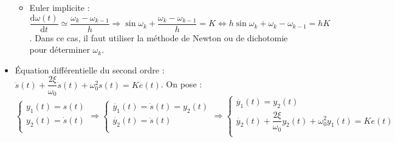 \documentclass[10pt,fleqn]{article} %
\begin{document}
\begin{itemize}[label=,font=\color{ocre}]
\begin{itemize}
\item Euler implicite : $\dfrac{\text{d} \omega(t)}{\text{d}t}\simeq \dfrac{\omega_{k}-\omega_{k-1}}{h} \Rightarrow \sin \omega_k +  \dfrac{\omega_{k}-\omega_{k-1}}{h}=K \Leftrightarrow h\sin \omega_k +  \omega_{k}-\omega_{k-1}=hK$. Dans ce cas, il faut utiliser la méthode de Newton ou de dichotomie pour déterminer $\omega_k$.
\end{itemize}
\item Équation différentielle du second ordre : $\ddot{s}(t) + \dfrac{2\xi}{\omega_0} \dot{s}(t) + \omega_0^2 s(t) = Ke(t)$.
On pose : 
$$
\left\{
\begin{array}{l}
y_1(t) = s(t) \\
y_2(t) = \dot{s}(t) \\
\end{array}
\right. 
\Rightarrow 
\left\{
\begin{array}{l}
\dot{y_1}(t) = \dot{s}(t) = y_2(t) \\
\dot{y_2}(t) = \ddot{s}(t) \\
\end{array}
\right.
\Rightarrow 
\left\{
\begin{array}{l}
\dot{y_1}(t) = y_2(t) \\
\dot{y_2}(t) + \dfrac{2\xi}{\omega_0} y_2(t)+ \omega_0^2 y_1(t) = Ke(t) \\
\end{array}
\right.
$$


\end{itemize}
\end{document}
